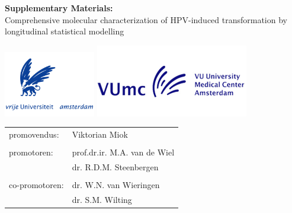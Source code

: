 \documentclass[10pt,a4paper]{book}
\begin{document}
\newpage
\thispagestyle{empty}
\begin{center}
\vspace{2.5cm}
{\bf\fontsize{16pt}{1em}\selectfont Supplementary Materials:\\}
\vspace{1.5cm}
  {\fontsize{16pt}{1em}\selectfont Comprehensive molecular characterization of HPV-induced transformation by longitudinal statistical modelling\\}
  \vspace{2.5cm}
\end{center}


\begin{center}
	\null\hspace{\fill}
  	\includegraphics[width=0.30\textwidth]{VU.png}%
  	\null\hspace{2cm}
  	\includegraphics[width=0.50\textwidth]{VUmc.jpg}
  	\hspace{\fill}\null
\end{center}
\vspace{4.5cm}

\thispagestyle{empty}
\begin{tabular}{ll}
promovendus: &  Viktorian Miok\\
\\
promotoren: & prof.dr.ir. M.A. van de Wiel\\
 & dr. R.D.M. Steenbergen \\
 \\
co-promotoren: & dr. W.N. van Wieringen\\
 & dr. S.M. Wilting \\

\end{tabular}
\end{document}
